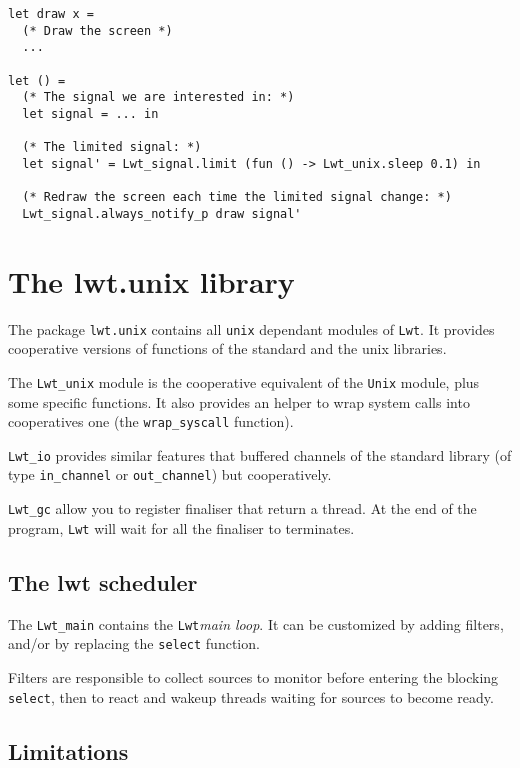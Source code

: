 \documentclass{article}
\newcommand{\lwt}{\texttt{Lwt}\xspace}
\begin{document}
\begin{verbatim}
let draw x =
  (* Draw the screen *)
  ...

let () =
  (* The signal we are interested in: *)
  let signal = ... in

  (* The limited signal: *)
  let signal' = Lwt_signal.limit (fun () -> Lwt_unix.sleep 0.1) in

  (* Redraw the screen each time the limited signal change: *)
  Lwt_signal.always_notify_p draw signal'
\end{verbatim}

\section{The lwt.unix library}
\label{lwt.unix}

The package \texttt{lwt.unix} contains all \texttt{unix} dependant
modules of \lwt. It provides cooperative versions of functions of the
standard and the unix libraries.

The \texttt{Lwt\_unix} module is the cooperative equivalent of the
\texttt{Unix} module, plus some specific functions. It also provides
an helper to wrap system calls into cooperatives one (the
\texttt{wrap\_syscall} function).

\texttt{Lwt\_io} provides similar features that buffered channels of
the standard library (of type \texttt{in\_channel} or
\texttt{out\_channel}) but cooperatively.

\texttt{Lwt\_gc} allow you to register finaliser that return a
thread. At the end of the program, \lwt will wait for all the
finaliser to terminates.

\subsection{The lwt scheduler}

The \texttt{Lwt\_main} contains the \lwt \emph{main loop}. It can be
customized by adding filters, and/or by replacing the \texttt{select}
function.

Filters are responsible to collect sources to monitor before entering
the blocking \texttt{select}, then to react and wakeup threads waiting
for sources to become ready.

\subsection{Limitations}
\end{document}
